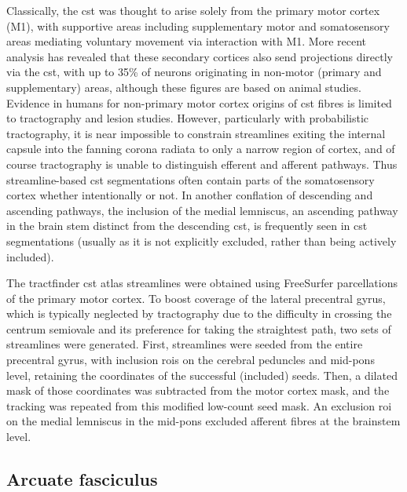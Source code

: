 \documentclass[12pt,phd,a4paper,twoside]{ucl_thesis}
\begin{document}
Classically, the \gls{cst} was thought to arise solely from the primary motor cortex (M1), with supportive areas including supplementary motor and somatosensory areas mediating voluntary movement via interaction with M1.
More recent analysis has revealed that these secondary cortices also send projections directly via the \gls{cst}\autocite{Kandel2021}, with up to 35\% of neurons originating in non-motor (primary and supplementary) areas, although these figures are based on animal studies\autocite{Welniarz2017}.
Evidence in humans for non-primary motor cortex origins of \gls{cst} fibres is limited to tractography and lesion studies\autocite{Kumar2009,Jane1967}.
However, particularly with probabilistic tractography, it is near impossible to constrain streamlines exiting the internal capsule into the fanning corona radiata to only a narrow region of cortex, and of course tractography is unable to distinguish efferent and afferent pathways.
Thus streamline-based \gls{cst} segmentations often contain parts of the somatosensory cortex whether intentionally or not\autocite{Poulin2022a}.
In another conflation of descending and ascending pathways, the inclusion of the medial lemniscus, an ascending pathway in the brain stem distinct from the descending \gls{cst}, is frequently seen in \gls{cst} segmentations (usually as it is not explicitly excluded, rather than being actively included)\autocite{Wasserthal2018,Warrington2020,Poulin2022a}.

The tractfinder \gls{cst} atlas streamlines were obtained using FreeSurfer parcellations \autocite{Desikan2006,FischlSalat2002} of the primary motor cortex.
To boost coverage of the lateral precentral gyrus, which is typically neglected by tractography due to the difficulty in crossing the centrum semiovale and its preference for taking the straightest path, two sets of streamlines were generated.
First, streamlines were seeded from the entire precentral gyrus, with inclusion \glspl{roi} on the cerebral peduncles and mid-pons level, retaining the coordinates of the successful (included) seeds.
Then, a dilated mask of those coordinates was subtracted from the motor cortex mask, and the tracking was repeated from this modified low-count seed mask.
An exclusion \gls{roi} on the medial lemniscus in the mid-pons excluded afferent fibres at the brainstem level.

\subsection{Arcuate fasciculus}
\end{document}
